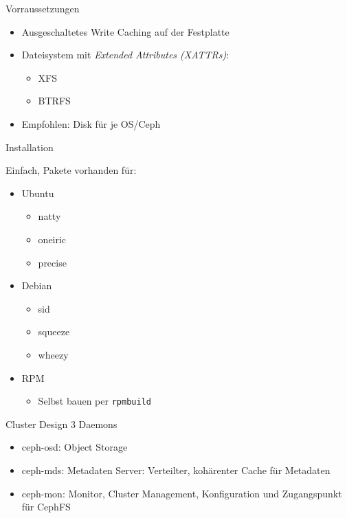 \documentclass[notes=hide,yellow]{beamer}
\begin{document}
\begin{frame}{Vorraussetzungen}
	\begin{itemize}
		\item Ausgeschaltetes Write Caching auf der Festplatte
		\item Dateisystem mit \emph{Extended Attributes (XATTRs)}:
		\begin{itemize}
			\item XFS
			\item BTRFS
		\end{itemize}
		\item Empfohlen: Disk f\"ur je OS/Ceph

	\end{itemize}
\end{frame}



\begin{frame}{Installation}

	Einfach, Pakete vorhanden f\"ur:
	\begin{itemize}
		\item Ubuntu
		\begin{itemize}
			\item natty
			\item oneiric
			\item precise
		\end{itemize}
		\item Debian
		\begin{itemize}
			\item sid
			\item squeeze
			\item wheezy
		\end{itemize}
		\item RPM 
		\begin{itemize}
			\item Selbst bauen per \texttt{rpmbuild}
		\end{itemize}
	\end{itemize}

\end{frame}


\begin{frame}{Cluster Design}
	3 Daemons
	\begin{itemize}
		\item ceph-osd: Object Storage
		\item ceph-mds: Metadaten Server: Verteilter, koh\"arenter Cache f\"ur Metadaten %
		\item ceph-mon: Monitor, Cluster Management, Konfiguration und Zugangspunkt f\"ur CephFS
	\end{itemize}
\end{frame}
\end{document}
